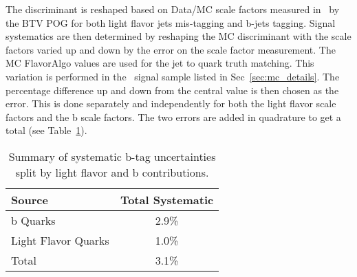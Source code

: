 The discriminant is reshaped based on Data/MC scale factors measured in~\cite{BTV11003} by the BTV POG for both light flavor jets mis-tagging and b-jets tagging. Signal systematics are then determined by reshaping the MC discriminant with the scale factors varied up and down by the error on the scale factor measurement. The MC FlavorAlgo values are used for the jet to quark truth matching. This variation is performed in the \ttZ \ signal sample listed in Sec~\ref{sec:mc_details}. The percentage difference up and down from the central value is then chosen as the error. This is done separately and independently for both the light flavor scale factors and the b scale factors. The two errors are added in quadrature to get a total (see Table~\ref{tab:systbTag}).


\begin{table}[h]
\caption{\label{tab:systbTag} Summary of systematic b-tag uncertainties split by light flavor and b contributions.}
\begin{center}
\begin{tabular}{lc}\hline
Source & Total Systematic \\ \hline
b Quarks & 2.9\% \\
Light Flavor Quarks & 1.0\% \\ \hline
Total & 3.1\% \\
\hline
\end{tabular}
\end{center}
\end{table}

